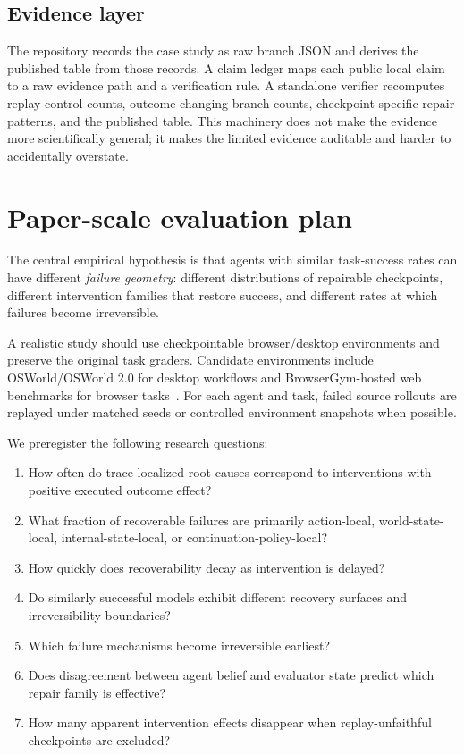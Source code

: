 \documentclass{article}
\begin{document}
\subsection{Evidence layer}
The repository records the case study as raw branch JSON and derives the published table from those records. A claim ledger maps each public local claim to a raw evidence path and a verification rule. A standalone verifier recomputes replay-control counts, outcome-changing branch counts, checkpoint-specific repair patterns, and the published table. This machinery does not make the evidence more scientifically general; it makes the limited evidence auditable and harder to accidentally overstate.

\section{Paper-scale evaluation plan}

The central empirical hypothesis is that agents with similar task-success rates can have different \emph{failure geometry}: different distributions of repairable checkpoints, different intervention families that restore success, and different rates at which failures become irreversible.

A realistic study should use checkpointable browser/desktop environments and preserve the original task graders. Candidate environments include OSWorld/OSWorld 2.0 for desktop workflows and BrowserGym-hosted web benchmarks for browser tasks~\citep{xie2024osworld,yuan2026osworld2,dechezelles2025browsergym}. For each agent and task, failed source rollouts are replayed under matched seeds or controlled environment snapshots when possible.

We preregister the following research questions:
\begin{enumerate}[leftmargin=*]
  \item How often do trace-localized root causes correspond to interventions with positive executed outcome effect?
  \item What fraction of recoverable failures are primarily action-local, world-state-local, internal-state-local, or continuation-policy-local?
  \item How quickly does recoverability decay as intervention is delayed?
  \item Do similarly successful models exhibit different recovery surfaces and irreversibility boundaries?
  \item Which failure mechanisms become irreversible earliest?
  \item Does disagreement between agent belief and evaluator state predict which repair family is effective?
  \item How many apparent intervention effects disappear when replay-unfaithful checkpoints are excluded?
\end{enumerate}
\end{document}
